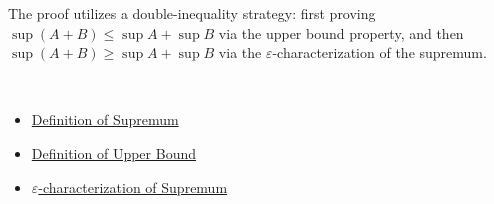 \begin{remark*}
The proof utilizes a double-inequality strategy: first proving $\sup(A+B) \le \sup A + \sup B$ via the upper bound property, and then $\sup(A+B) \ge \sup A + \sup B$ via the $\varepsilon$-characterization of the supremum.
\end{remark*}

\begin{remark*}[Dependencies]~\\
\begin{itemize}
  \item \hyperref[pred:supremum]{Definition of Supremum}
  \item \hyperref[pred:upper-bound]{Definition of Upper Bound}
  \item \hyperref[thm:epsilon-characterization-supremum]{$\varepsilon$-characterization of Supremum}
\end{itemize}
\end{remark*}